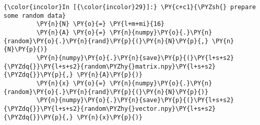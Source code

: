     \begin{Verbatim}[commandchars=\\\{\}]
{\color{incolor}In [{\color{incolor}29}]:} \PY{c+c1}{\PYZsh{} prepare some random data}
         \PY{n}{N} \PY{o}{=} \PY{l+m+mi}{16}
         \PY{n}{A} \PY{o}{=} \PY{n}{numpy}\PY{o}{.}\PY{n}{random}\PY{o}{.}\PY{n}{rand}\PY{p}{(}\PY{n}{N}\PY{p}{,} \PY{n}{N}\PY{p}{)}
         \PY{n}{numpy}\PY{o}{.}\PY{n}{save}\PY{p}{(}\PY{l+s+s2}{\PYZdq{}}\PY{l+s+s2}{random\PYZhy{}matrix.npy}\PY{l+s+s2}{\PYZdq{}}\PY{p}{,} \PY{n}{A}\PY{p}{)}
         \PY{n}{x} \PY{o}{=} \PY{n}{numpy}\PY{o}{.}\PY{n}{random}\PY{o}{.}\PY{n}{rand}\PY{p}{(}\PY{n}{N}\PY{p}{)}
         \PY{n}{numpy}\PY{o}{.}\PY{n}{save}\PY{p}{(}\PY{l+s+s2}{\PYZdq{}}\PY{l+s+s2}{random\PYZhy{}vector.npy}\PY{l+s+s2}{\PYZdq{}}\PY{p}{,} \PY{n}{x}\PY{p}{)}
\end{Verbatim}

